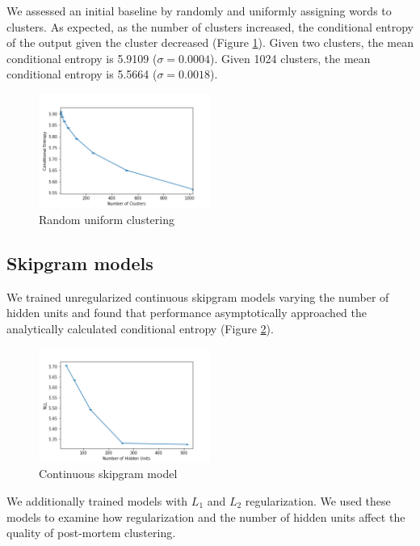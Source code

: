 \documentclass[11pt,letterpaper]{article}
\begin{document}
We assessed an initial baseline by randomly and uniformly assigning words to clusters. As expected, as the number of clusters increased, the conditional entropy of the output given the cluster decreased (Figure \ref{f:random}). Given two clusters, the mean conditional entropy is 5.9109 ($\sigma=0.0004$). Given 1024 clusters, the mean conditional entropy is 5.5664 ($\sigma=0.0018$).

\begin{figure}
  \caption{Random uniform clustering}
\label{f:random}
  \centering
    \includegraphics[width=0.5\textwidth]{random.png}
\end{figure}

\subsection{Skipgram models}

We trained unregularized continuous skipgram models varying the number of hidden units and found that performance asymptotically approached the analytically calculated conditional entropy (Figure \ref{f:baseline}). 

\begin{figure}
  \caption{Continuous skipgram model}
\label{f:baseline}
  \centering
    \includegraphics[width=0.5\textwidth]{baseline.png}
\end{figure}

We additionally trained models with $L_1$ and $L_2$ regularization. We used these models to examine how regularization and the number of hidden units affect the quality of post-mortem clustering. 
\end{document}
